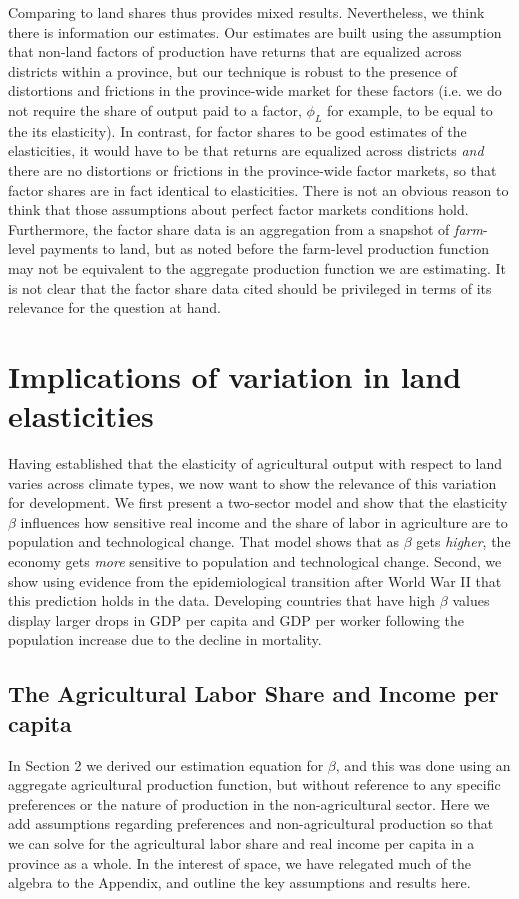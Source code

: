 \documentclass[11pt]{article}
\begin{document}
Comparing to land shares thus provides mixed results. Nevertheless, we think there is information our estimates. Our estimates are built using the assumption that non-land factors of production have returns that are equalized across districts within a province, but our technique is robust to the presence of distortions and frictions in the province-wide market for these factors (i.e. we do not require the share of output paid to a factor, $\phi_L$ for example, to be equal to the its elasticity). In contrast, for factor shares to be good estimates of the elasticities, it would have to be that returns are equalized across districts \textit{and} there are no distortions or frictions in the province-wide factor markets, so that factor shares are in fact identical to elasticities. There is not an obvious reason to think that those assumptions about perfect factor markets conditions hold. Furthermore, the factor share data is an aggregation from a snapshot of \textit{farm}-level payments to land, but as noted before the farm-level production function may not be equivalent to the aggregate production function we are estimating. It is not clear that the factor share data cited should be privileged in terms of its relevance for the question at hand.

\section{Implications of variation in land elasticities}\label{SEC_implications}
Having established that the elasticity of agricultural output with respect to land varies across climate types, we now want to show the relevance of this variation for development. We first present a two-sector model and show that the elasticity $\beta$ influences how sensitive real income and the share of labor in agriculture are to population and technological change. That model shows that as $\beta$ gets \textit{higher}, the economy gets \textit{more} sensitive to population and technological change. Second, we show using evidence from the epidemiological transition after World War II that this prediction holds in the data. Developing countries that have high $\beta$ values display larger drops in GDP per capita and GDP per worker following the population increase due to the decline in mortality.

\subsection{The Agricultural Labor Share and Income per capita}
In Section 2 we derived our estimation equation for $\beta$, and this was done using an aggregate agricultural production function, but without reference to any specific preferences or the nature of production in the non-agricultural sector. Here we add assumptions regarding preferences and non-agricultural production so that we can solve for the agricultural labor share and real income per capita in a province as a whole. In the interest of space, we have relegated much of the algebra to the Appendix, and outline the key assumptions and results here. 
\end{document}
